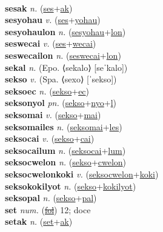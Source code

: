  \label{'seseltilip} \\
\textbf{sesak} \textit{n.} (\hyperref[ses]{ses}+\hyperref[ak]{ak})
 \label{sesak} \\
\textbf{sesyohau} \textit{v.} (\hyperref[ses]{ses}+\hyperref[yohau]{yohau})
 \label{sesyohau} \\
\textbf{sesyohaulon} \textit{n.} (\hyperref[sesyohau]{sesyohau}+\hyperref[lon]{lon})
 \label{sesyohaulon} \\
\textbf{seswecai} \textit{v.} (\hyperref[ses]{ses}+\hyperref[wecai]{wecai})
 \label{seswecai} \\
\textbf{seswecailon} \textit{n.} (\hyperref[seswecai]{seswecai}+\hyperref[lon]{lon})
 \label{seswecailon} \\
\textbf{sekal} \textit{n.} (Epo. ⟨sekalo⟩ [seˈkalo])
 \label{sekal} \\
\textbf{sekso} \textit{v.} (Spa. ⟨sexo⟩ [ˈsekso])
 \label{sekso} \\
\textbf{seksoec} \textit{n.} (\hyperref[sekso]{sekso}+\hyperref[ec]{ec})
 \label{seksoec} \\
\textbf{seksonyol} \textit{pn.} (\hyperref[sekso]{sekso}+\hyperref[nyo]{nyo}+\hyperref[l]{l})
 \label{seksonyol} \\
\textbf{seksomai} \textit{v.} (\hyperref[sekso]{sekso}+\hyperref[mai]{mai})
 \label{seksomai} \\
\textbf{seksomailes} \textit{n.} (\hyperref[seksomai]{seksomai}+\hyperref[les]{les})
 \label{seksomailes} \\
\textbf{seksocai} \textit{v.} (\hyperref[sekso]{sekso}+\hyperref[cai]{cai})
 \label{seksocai} \\
\textbf{seksocailum} \textit{n.} (\hyperref[seksocai]{seksocai}+\hyperref[lum]{lum})
 \label{seksocailum} \\
\textbf{seksocwelon} \textit{n.} (\hyperref[sekso]{sekso}+\hyperref[cwelon]{cwelon})
 \label{seksocwelon} \\
\textbf{seksocwelonkoki} \textit{v.} (\hyperref[seksocwelon]{seksocwelon}+\hyperref[koki]{koki})
 \label{seksocwelonkoki} \\
\textbf{seksokokilyot} \textit{n.} (\hyperref[sekso]{sekso}+\hyperref[kokilyot]{kokilyot})
 \label{seksokokilyot} \\
\textbf{seksopal} \textit{n.} (\hyperref[sekso]{sekso}+\hyperref[pal]{pal})
 \label{seksopal} \\
\textbf{set} \textit{num.} (\hyperref[fol]{\sout{fol}})
12; doce \label{set} \\
\textbf{setak} \textit{n.} (\hyperref[set]{set}+\hyperref[ak]{ak})
